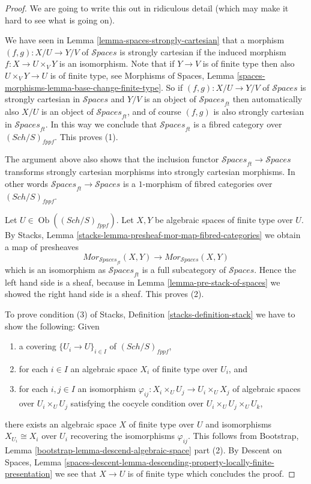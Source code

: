 \documentclass[10pt,a4paper]{amsart}
\theoremstyle{plain}
\theoremstyle{definition}
\theoremstyle{remark}
\numberwithin{equation}{subsection}
\def\Sch{\mathit{Sch}}
\def\Ob{\mathop{\mathrm{Ob}}\nolimits}
\def\Spacesstack{\mathcal{S}\!\mathit{paces}}
\begin{document}
\begin{proof}
We are going to write this out in ridiculous detail (which may make
it hard to see what is going on).

\medskip\noindent
We have seen in
Lemma \ref{lemma-spaces-strongly-cartesian}
that a morphism $(f, g) : X/U \to Y/V$ of $\Spacesstack$ is
strongly cartesian if the induced morphism $f : X \to U \times_V Y$
is an isomorphism. Note that if $Y \to V$ is of finite type
then also $U \times_V Y \to U$ is of finite type, see
Morphisms of Spaces,
Lemma \ref{spaces-morphisms-lemma-base-change-finite-type}.
So if $(f, g) : X/U \to Y/V$ of $\Spacesstack$ is
strongly cartesian in $\Spacesstack$ and $Y/V$ is an object
of $\Spacesstack_{ft}$ then automatically also $X/U$ is an
object of $\Spacesstack_{ft}$, and of course $(f, g)$ is
also strongly cartesian in $\Spacesstack_{ft}$. In this way
we conclude that $\Spacesstack_{ft}$ is a fibred category over
$(\Sch/S)_{fppf}$. This proves (1).

\medskip\noindent
The argument above also shows that the inclusion
functor $\Spacesstack_{ft} \to \Spacesstack$ transforms
strongly cartesian morphisms into strongly cartesian morphisms.
In other words $\Spacesstack_{ft} \to \Spacesstack$ is
a $1$-morphism of fibred categories over $(\Sch/S)_{fppf}$.

\medskip\noindent
Let $U \in \Ob((\Sch/S)_{fppf})$.
Let $X, Y$ be algebraic spaces of finite type over $U$. By
Stacks, Lemma \ref{stacks-lemma-presheaf-mor-map-fibred-categories}
we obtain a map of presheaves
$$
\mathit{Mor}_{\Spacesstack_{ft}}(X, Y)
\longrightarrow
\mathit{Mor}_{\Spacesstack}(X, Y)
$$
which is an isomorphism as $\Spacesstack_{ft}$ is a full subcategory of
$\Spacesstack$. Hence the left hand side is a sheaf, because in
Lemma \ref{lemma-pre-stack-of-spaces}
we showed the right hand side is a sheaf. This proves (2).

\medskip\noindent
To prove condition (3) of
Stacks, Definition \ref{stacks-definition-stack}
we have to show the following: Given
\begin{enumerate}
\item a covering $\{U_i \to U\}_{i \in I}$ of $(\Sch/S)_{fppf}$,
\item for each $i \in I$ an algebraic space $X_i$ of finite type over $U_i$,
and
\item for each $i, j \in I$ an isomorphism
$\varphi_{ij} : X_i \times_U U_j \to U_i \times_U X_j$ of algebraic spaces
over $U_i \times_U U_j$ satisfying the cocycle condition over
$U_i \times_U U_j \times_U U_k$,
\end{enumerate}
there exists an algebraic space $X$ of finite type over $U$ and isomorphisms
$X_{U_i} \cong X_i$ over $U_i$ recovering the isomorphisms $\varphi_{ij}$.
This follows from
Bootstrap, Lemma \ref{bootstrap-lemma-descend-algebraic-space} part (2). By
Descent on Spaces, Lemma
\ref{spaces-descent-lemma-descending-property-locally-finite-presentation}
we see that $X \to U$ is of finite type which concludes the proof.
\end{proof}
\end{document}
